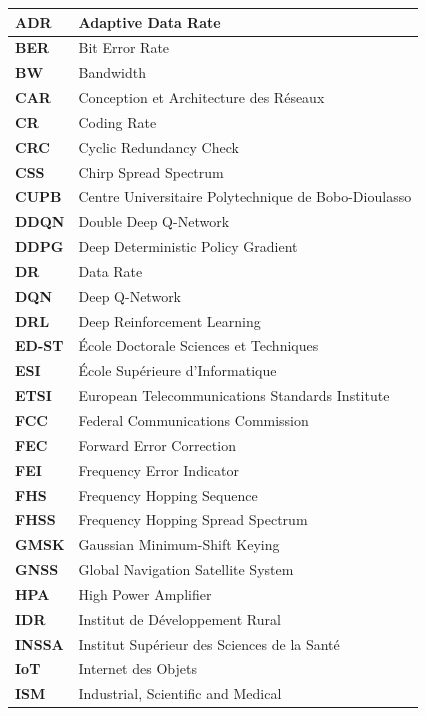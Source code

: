 \begin{longtable}{|>{\centering\arraybackslash}p{4cm}|p{10cm}|}
	\textbf{ADR} & Adaptive Data Rate \\
	\hline
	\textbf{BER} & Bit Error Rate \\
	\hline
	\textbf{BW} & Bandwidth \\
	\hline
	\textbf{CAR} & Conception et Architecture des Réseaux \\
	\hline
	\textbf{CR} & Coding Rate \\
	\hline
	\textbf{CRC} & Cyclic Redundancy Check \\
	\hline
	\textbf{CSS} & Chirp Spread Spectrum \\
	\hline
	\textbf{CUPB} & Centre Universitaire Polytechnique de Bobo-Dioulasso \\
	\hline
	\textbf{DDQN} & Double Deep Q-Network \\
	\hline
	\textbf{DDPG} & Deep Deterministic Policy Gradient \\
	\hline
	\textbf{DR} & Data Rate \\
	\hline
	\textbf{DQN} & Deep Q-Network \\
	\hline
	\textbf{DRL} & Deep Reinforcement Learning \\
	\hline
	\textbf{ED-ST} & École Doctorale Sciences et Techniques \\
	\hline
	\textbf{ESI} & École Supérieure d'Informatique \\
	\hline
	\textbf{ETSI} & European Telecommunications Standards Institute \\
	\hline
	\textbf{FCC} & Federal Communications Commission \\
	\hline
	\textbf{FEC} & Forward Error Correction \\
	\hline
	\textbf{FEI} & Frequency Error Indicator \\
	\hline
	\textbf{FHS} & Frequency Hopping Sequence \\
	\hline
	\textbf{FHSS} & Frequency Hopping Spread Spectrum \\
	\hline
	\textbf{GMSK} & Gaussian Minimum-Shift Keying \\
	\hline
	\textbf{GNSS} & Global Navigation Satellite System \\
	\hline
	\textbf{HPA} & High Power Amplifier \\
	\hline
	\textbf{IDR} & Institut de Développement Rural \\
	\hline
	\textbf{INSSA} & Institut Supérieur des Sciences de la Santé \\
	\hline
	\textbf{IoT} & Internet des Objets \\
	\hline
	\textbf{ISM} & Industrial, Scientific and Medical \\

\end{longtable}

